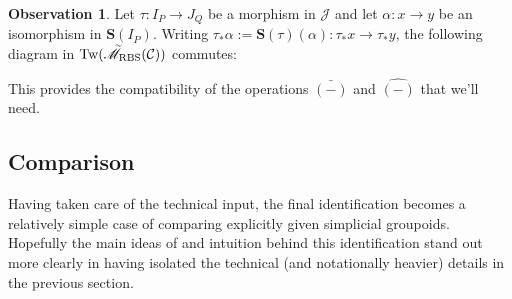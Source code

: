 \documentclass[12pt, reqno]{amsart}
\theoremstyle{plain}
\theoremstyle{definition}
\newtheorem{observation}[theorem]{Observation}
\renewcommand{\phi}{\varphi}
\begin{document}
\begin{observation}\label{compatibility: isos and morphisms}
Let $\tau\colon I_P\rightarrow J_Q$ be a morphism in $\mathcal{J}$ and let $\alpha\colon x\rightarrow y$ be an isomorphism in $\mathbf{S}(I_P)$. Writing $\tau_*\alpha:=\mathbf{S}(\tau)(\alpha)\colon \tau_*x\rightarrow \tau_*y$, the following diagram in $\operatorname{Tw}(\accentset{\sim}{\mathscr{M}}_{\operatorname{RBS}}(\mathcal{C}))$ commutes:
\begin{center}
\end{center}
This provides the compatibility of the operations $\bar{\scriptstyle(-)}$ and $\hat{\scriptstyle(-)}$ that we'll need.
\end{observation}

\subsection{Comparison}

Having taken care of the technical input, the final identification becomes a relatively simple case of comparing explicitly given simplicial groupoids. Hopefully the main ideas of and intuition behind this identification stand out more clearly in having isolated the technical (and notationally heavier) details in the previous section.
\end{document}
